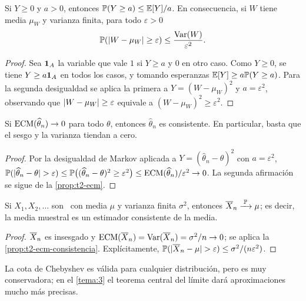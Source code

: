 \begin{lema}\label{lem:t2-chebyshev}
Si $Y\ge0$ y $a>0$, entonces $\mathbb{P}(Y\ge a)\le\mathbb{E}[Y]/a$. En consecuencia, si $W$ tiene media $\mu_W$ y varianza finita, para todo $\varepsilon>0$
\[
\mathbb{P}(\lvert W-\mu_W\rvert\ge\varepsilon)\le\frac{\operatorname{Var}(W)}{\varepsilon^{2}}.
\]
\end{lema}

\begin{proof}
Sea $\mathbf{1}_A$ la variable que vale $1$ si $Y\ge a$ y $0$ en otro caso. Como $Y\ge0$, se tiene $Y\ge a\mathbf{1}_A$ en todos los casos, y tomando esperanzas $\mathbb{E}[Y]\ge a\mathbb{P}(Y\ge a)$. Para la segunda desigualdad se aplica la primera a $Y=(W-\mu_W)^{2}$ y $a=\varepsilon^{2}$, observando que $\lvert W-\mu_W\rvert\ge\varepsilon$ equivale a $(W-\mu_W)^{2}\ge\varepsilon^{2}$.
\end{proof}

\begin{proposicion}\label{prop:t2-ecm-consistencia}
Si $\operatorname{ECM}(\widehat\theta_n)\to0$ para todo $\theta$, entonces $\widehat\theta_n$ es consistente. En particular, basta que el sesgo y la varianza tiendan a cero.
\end{proposicion}

\begin{proof}
Por la desigualdad de Markov aplicada a $Y=(\widehat\theta_n-\theta)^{2}$ con $a=\varepsilon^{2}$, $\mathbb{P}(\lvert\widehat\theta_n-\theta\rvert>\varepsilon)\le\mathbb{P}\bigl((\widehat\theta_n-\theta)^{2}\ge\varepsilon^{2}\bigr)\le\operatorname{ECM}(\widehat\theta_n)/\varepsilon^{2}\to0$. La segunda afirmación se sigue de la \cref{prop:t2-ecm}.
\end{proof}

\begin{teorema}\label{teo:t2-lgn}
Si $X_1,X_2,\dots$ son \iid\ con media $\mu$ y varianza finita $\sigma^{2}$, entonces $\overline{X}_n\xrightarrow{\;\mathbb{P}\;}\mu$; es decir, la media muestral es un estimador consistente de la media.
\end{teorema}

\begin{proof}
$\overline{X}_n$ es insesgado y $\operatorname{ECM}(\overline{X}_n)=\operatorname{Var}(\overline{X}_n)=\sigma^{2}/n\to0$; se aplica la \cref{prop:t2-ecm-consistencia}. Explícitamente, $\mathbb{P}(\lvert\overline{X}_n-\mu\rvert>\varepsilon)\le\sigma^{2}/(n\varepsilon^{2})$.
\end{proof}

La cota de Chebyshev es válida para cualquier distribución, pero es muy conservadora; en el \cref{tema:3} el teorema central del límite dará aproximaciones mucho más precisas.

